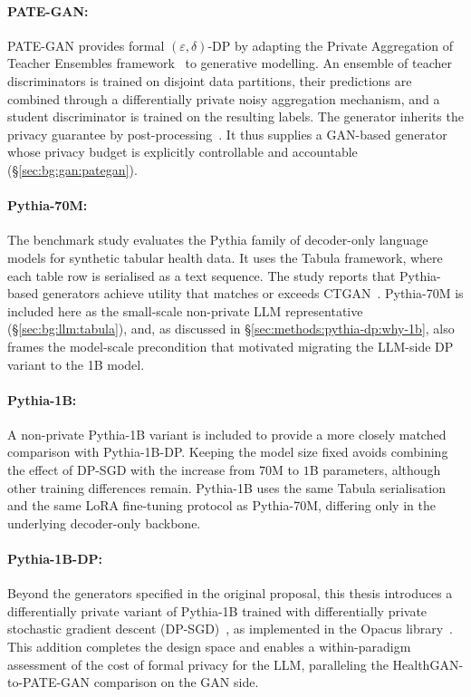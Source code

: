 \paragraph{PATE-GAN:}
PATE-GAN provides formal $(\varepsilon,\delta)$-DP by adapting the Private
Aggregation of Teacher Ensembles framework~\cite{Papernot2017PATE} to
generative modelling. An ensemble of teacher discriminators is trained on
disjoint data partitions, their predictions are combined through a
differentially private noisy aggregation mechanism, and a student
discriminator is trained on the resulting labels. The generator
inherits the privacy guarantee by post-processing~\cite{pategan}. It thus
supplies a GAN-based generator whose privacy budget is explicitly controllable
and accountable (\S\ref{sec:bg:gan:pategan}).

\paragraph{Pythia-70M:}
The benchmark study evaluates the Pythia family of decoder-only language
models for synthetic tabular health data. It uses the
Tabula framework, where each table row is serialised as a text sequence.
The study reports that Pythia-based generators achieve utility that matches
or exceeds CTGAN~\cite{Miletic2024}. Pythia-70M is included here as the
small-scale non-private LLM representative (\S\ref{sec:bg:llm:tabula}), and,
as discussed in \S\ref{sec:methods:pythia-dp:why-1b}, also frames the
model-scale precondition that motivated migrating the LLM-side DP variant to
the 1B model.

\paragraph{Pythia-1B:}
A non-private Pythia-1B variant is included to provide a more closely
matched comparison with Pythia-1B-DP. Keeping the model size fixed avoids
combining the effect of DP-SGD with the increase from $70$M to $1$B
parameters, although other training differences remain. Pythia-1B
uses the same Tabula serialisation and the same LoRA fine-tuning protocol as
Pythia-70M, differing only in the underlying decoder-only backbone.

\paragraph{Pythia-1B-DP:}
Beyond the generators specified in the original proposal, this thesis
introduces a differentially private variant of Pythia-1B trained with
differentially private stochastic gradient descent
(DP-SGD)~\cite{Abadi2016DPSGD}, as implemented in the Opacus
library~\cite{Yousefpour2021Opacus}. This addition completes the design space
and enables a within-paradigm assessment of the cost of formal privacy for the
LLM, paralleling the HealthGAN-to-PATE-GAN comparison on the GAN side.


